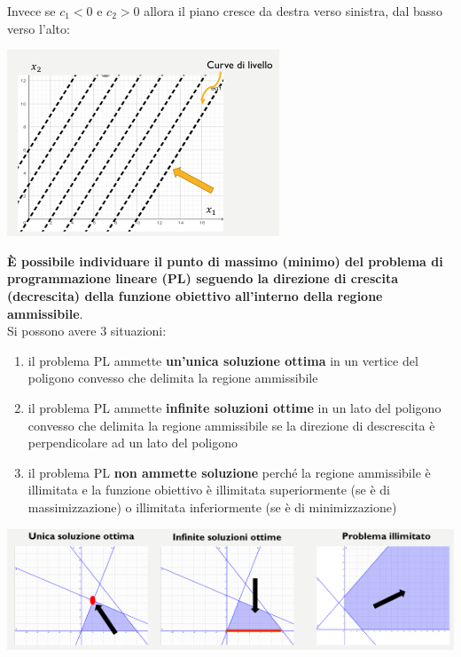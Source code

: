 \message{ !name(ro.tex)}\documentclass[a4paper,12pt, oneside]{book}
\begin{document}
Invece se $c_1<0$ e $c_2>0$ allora il piano cresce da destra verso
sinistra, dal basso verso l’alto:
\begin{center}
  \includegraphics[scale = 0.7]{img/3d4.png}
\end{center}
\textbf{È possibile individuare il punto di massimo (minimo) del
  problema di programmazione lineare (PL) seguendo la direzione di crescita
  (decrescita) della funzione obiettivo all’interno della regione
  ammissibile}.\\
Si possono avere 3 situazioni:
\begin{enumerate}
  \item il problema PL ammette \textbf{un’unica soluzione ottima} in un
  vertice del poligono convesso che delimita la regione ammissibile
  \item il problema PL ammette \textbf{ infinite soluzioni ottime} in
  un lato del poligono convesso che delimita la regione ammissibile
  se la direzione di descrescita è perpendicolare ad un lato del
  poligono
  \item il problema PL \textbf{non ammette soluzione} perché la
  regione   ammissibile è illimitata e la funzione obiettivo
  è illimitata superiormente (se è di massimizzazione) o
  illimitata inferiormente (se è di minimizzazione)
\end{enumerate}
\begin{center}
  \includegraphics[scale = 0.7]{img/3d5.png}
\end{center}
\end{document}
